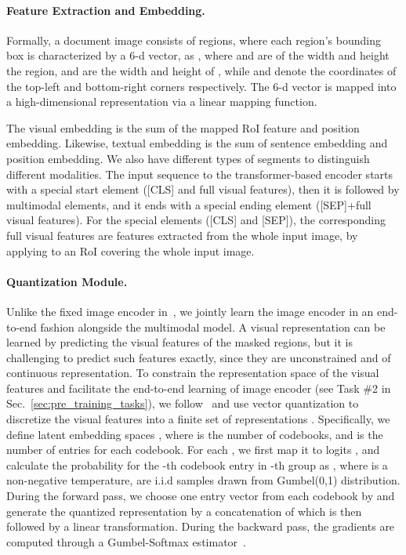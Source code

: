 \documentclass{article}
\begin{document}
	\paragraph{Feature Extraction and Embedding.}
	Formally, a document image  consists of  regions, {where each region's bounding box is characterized by a 6-d vector}, as , where  and  are of the width and height the {region},  and  are the width and height of {}, {while}  and  denote the coordinate{s} of the top-left and bottom-right corner{s} respectively. The 6-d vector is {mapped} into a high-dimensional representation via {a} linear mapping function.
	
	The visual embedding is the sum of the {mapped RoI feature and position embedding}. {Likewise, textual embedding is the sum of sentence embedding and position embedding}. We {also have different types of segments to distinguish different modalities}.
	The input sequence {to the transformer-based encoder} starts with a special start element ([CLS] and full {visual} feature{s}), {then it is followed by} multimodal elements, and {it} ends with a special ending element ([SEP]+full {visual} feature{s}). For the special elements ({[CLS] and [SEP]}), the corresponding full {visual} features are features extracted {from} the whole input image, by applying {} {to} an RoI covering the whole input image.
	
	\paragraph{Quantization Module.}
	Unlike the {fixed image encoder} in~\cite{selfdoc2021}, we jointly learn the image encoder {in an end-to-end fashion} {alongside the multimodal model.} {{A visual} representation can be learned by predicting the visual
		features of the masked regions, but it is challenging to predict such features {exactly, since they} are unconstrained and of continuous representation.} To {{constrain the representation space of the visual features} and {facilitate} the end-to-end learning of image encoder (see Task \#2 in Sec.~\ref{sec:pre_training_tasks})}, {we follow~\cite{oord2017neural,baevski2020wav2vec} and use} vector quantization to discretize the visual features {} {in}to a finite set of representations {}.
Specifically, we define latent embedding spaces {}, where  is the number of codebooks, and  is the number of entries for each codebook. For each {}, we first map it to logits {}, and calculate the probability for the -th codebook entry in -th group as , where  is a non-negative temperature,  are i.i.d samples drawn from  Gumbel(0,1) distribution. During the forward pass, we choose one entry vector from each codebook by {} and generate the quantized representation {} by a concatenation of {} {which is then followed by} a linear transformation. During the backward pass, the gradients are {computed through a} Gumbel-Softmax estimator~\cite{jang2016categorical}.
	
\end{document}
